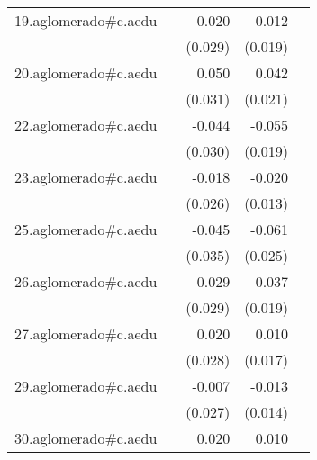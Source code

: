 {\begin{longtable}{l*{4}{D{.}{.}{-1}}}
\addlinespace
19.aglomerado#c.aedu&                     &       0.020         &       0.012         &                     \\
            &                     &     (0.029)         &     (0.019)         &                     \\
\addlinespace
20.aglomerado#c.aedu&                     &       0.050         &       0.042\sym{*}  &                     \\
            &                     &     (0.031)         &     (0.021)         &                     \\
\addlinespace
22.aglomerado#c.aedu&                     &      -0.044         &      -0.055\sym{**} &                     \\
            &                     &     (0.030)         &     (0.019)         &                     \\
\addlinespace
23.aglomerado#c.aedu&                     &      -0.018         &      -0.020         &                     \\
            &                     &     (0.026)         &     (0.013)         &                     \\
\addlinespace
25.aglomerado#c.aedu&                     &      -0.045         &      -0.061\sym{*}  &                     \\
            &                     &     (0.035)         &     (0.025)         &                     \\
\addlinespace
26.aglomerado#c.aedu&                     &      -0.029         &      -0.037         &                     \\
            &                     &     (0.029)         &     (0.019)         &                     \\
\addlinespace
27.aglomerado#c.aedu&                     &       0.020         &       0.010         &                     \\
            &                     &     (0.028)         &     (0.017)         &                     \\
\addlinespace
29.aglomerado#c.aedu&                     &      -0.007         &      -0.013         &                     \\
            &                     &     (0.027)         &     (0.014)         &                     \\
\addlinespace
30.aglomerado#c.aedu&                     &       0.020         &       0.010         &                     \\

\end{longtable}}
